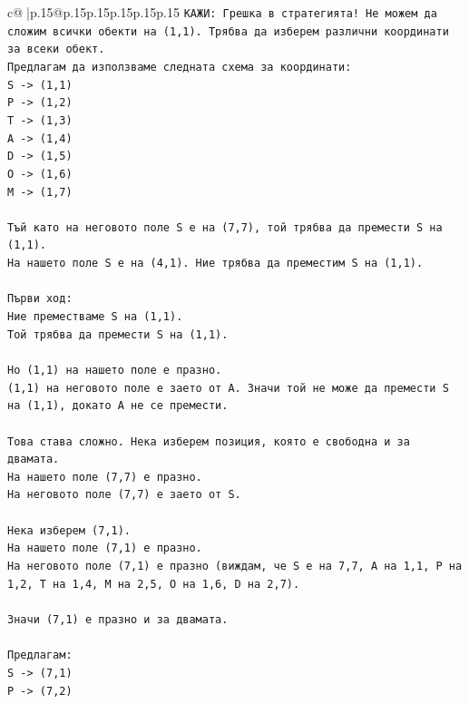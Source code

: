 \documentclass{article}
\begin{document}
{\begin{supertabular}{c@{$\;$}|p{.15\linewidth}@{}p{.15\linewidth}p{.15\linewidth}p{.15\linewidth}p{.15\linewidth}p{.15\linewidth}}
{{{\texttt{КАЖИ: Грешка в стратегията! Не можем да сложим всички обекти на (1,1). Трябва да изберем различни координати за всеки обект.} \\
\texttt{Предлагам да използваме следната схема за координати:} \\
\texttt{S {-}> (1,1)} \\
\texttt{P {-}> (1,2)} \\
\texttt{T {-}> (1,3)} \\
\texttt{A {-}> (1,4)} \\
\texttt{D {-}> (1,5)} \\
\texttt{O {-}> (1,6)} \\
\texttt{M {-}> (1,7)} \\
\\ 
\texttt{Тъй като на неговото поле S е на (7,7), той трябва да премести S на (1,1).} \\
\texttt{На нашето поле S е на (4,1). Ние трябва да преместим S на (1,1).} \\
\\ 
\texttt{Първи ход:} \\
\texttt{Ние преместваме S на (1,1).} \\
\texttt{Той трябва да премести S на (1,1).} \\
\\ 
\texttt{Но (1,1) на нашето поле е празно.} \\
\texttt{(1,1) на неговото поле е заето от A. Значи той не може да премести S на (1,1), докато A не се премести.} \\
\\ 
\texttt{Това става сложно. Нека изберем позиция, която е свободна и за двамата.} \\
\texttt{На нашето поле (7,7) е празно.} \\
\texttt{На неговото поле (7,7) е заето от S.} \\
\\ 
\texttt{Нека изберем (7,1).} \\
\texttt{На нашето поле (7,1) е празно.} \\
\texttt{На неговото поле (7,1) е празно (виждам, че S е на 7,7, A на 1,1, P на 1,2, T на 1,4, M на 2,5, O на 1,6, D на 2,7).} \\
\\ 
\texttt{Значи (7,1) е празно и за двамата.} \\
\\ 
\texttt{Предлагам:} \\
\texttt{S {-}> (7,1)} \\
\texttt{P {-}> (7,2)} \\
}}}
\end{supertabular}}
\end{document}
